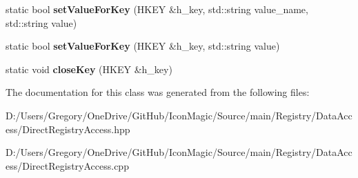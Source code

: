 \begin{DoxyCompactItemize}
\item 
\hypertarget{class_direct_registry_access_a9a80842fdb2b503215fe757632d0448b}{}static bool {\bfseries set\+Value\+For\+Key} (H\+K\+E\+Y \&h\+\_\+key, std\+::string value\+\_\+name, std\+::string value)\label{class_direct_registry_access_a9a80842fdb2b503215fe757632d0448b}

\item 
\hypertarget{class_direct_registry_access_a7d09201af3a73bc290d6334fdd09ea6b}{}static bool {\bfseries set\+Value\+For\+Key} (H\+K\+E\+Y \&h\+\_\+key, std\+::string value)\label{class_direct_registry_access_a7d09201af3a73bc290d6334fdd09ea6b}

\item 
\hypertarget{class_direct_registry_access_a05d4a5bbed79beba121eddf512fda0a0}{}static void {\bfseries close\+Key} (H\+K\+E\+Y \&h\+\_\+key)\label{class_direct_registry_access_a05d4a5bbed79beba121eddf512fda0a0}

\end{DoxyCompactItemize}


The documentation for this class was generated from the following files\+:\begin{DoxyCompactItemize}
\item 
D\+:/\+Users/\+Gregory/\+One\+Drive/\+Git\+Hub/\+Icon\+Magic/\+Source/main/\+Registry/\+Data\+Access/Direct\+Registry\+Access.\+hpp\item 
D\+:/\+Users/\+Gregory/\+One\+Drive/\+Git\+Hub/\+Icon\+Magic/\+Source/main/\+Registry/\+Data\+Access/Direct\+Registry\+Access.\+cpp\end{DoxyCompactItemize}
